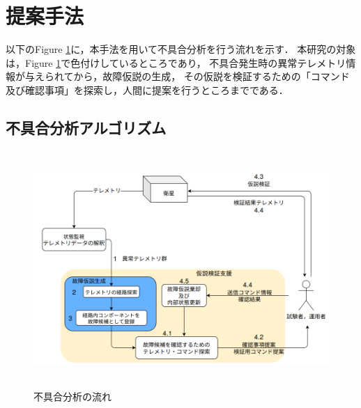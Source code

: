 \documentclass[11pt]{article}
\begin{document}

\section{提案手法}
以下のFigure \ref{fig:fault_diagnosis}に，本手法を用いて不具合分析を行う流れを示す．
本研究の対象は，Figure \ref{fig:fault_diagnosis}で色付けしているところであり，
不具合発生時の異常テレメトリ情報が与えられてから，故障仮説の生成，
その仮説を検証するための「コマンド及び確認事項」を探索し，人間に提案を行うところまでである．

\subsection{不具合分析アルゴリズム}
\begin{figure}[H]
   \centering
      \includegraphics[height=9.0cm]{figure/fault_diagnosis_flow.png}
      \caption{不具合分析の流れ}
      \label{fig:fault_diagnosis}
\end{figure}
\end{document}
